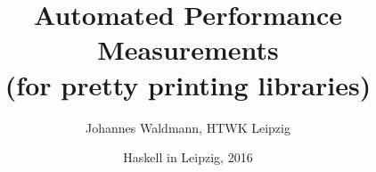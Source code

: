\documentclass[final,12pt]{beamer}
\title[Automated Performance Measurements]{
  Automated Performance Measurements \\
  (for pretty printing libraries)
}
\author{Johannes Waldmann, 
  HTWK Leipzig
}
\date[HAL'16]{
  Haskell in Leipzig, 2016
}
\begin{document}
\frame{\titlepage}

\newenvironment{slide}[1]%
{\begin{frame}\frametitle{#1}}
{\end{frame}}

% 




% 
% 











% 
\end{document}
